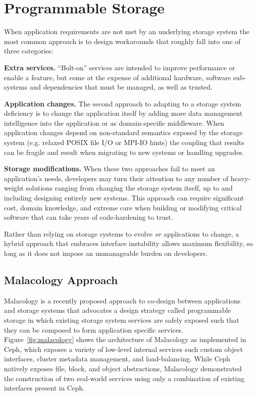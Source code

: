 \section{Programmable Storage}
\label{sec:progly}

When application requirements are not met by an underlying storage system the
most common approach is to design workarounds that roughly fall into one
of three categories:

{\bf Extra services.} ``Bolt-on'' services are intended to improve performance
or enable a feature, but come at the expense of additional hardware, software
sub-systems and dependencies that must be managed, as well as trusted.

{\bf Application changes.} The second approach to adapting to a storage system
deficiency is to change the application itself by adding more data management
intelligence into the application or as domain-specific middleware. When
application changes depend on non-standard semantics exposed by the storage
system (e.g. relaxed POSIX file I/O or MPI-IO hints) the coupling that results
can be fragile and result when migrating to new systems or handling upgrades.

{\bf Storage modifications.} When these two approaches fail to meet an
application's needs, developers may turn their attention to any number of
heavy-weight solutions ranging from changing the storage system itself, up to
and including designing entirely new systems. This approach can require
significant cost, domain knowledge, and extreme care when building or
modifying critical software that can take years of code-hardening to trust.

Rather than relying on storage systems to evolve \emph{or} applications to
change, a hybrid approach that embraces interface instability allows maximum
flexibility, so long as it does not impose an unmanageable burden on
developers.

\subsection{Malacology Approach}

Malacology is a recently proposed approach to co-design between applications
and storage systems that advocates a design strategy called programmable
storage in which existing storage system services are safely exposed such that
they can be composed to form application specific services.
Figure~\ref{fig:malacology} shows the architecture of Malacology as
implemented in Ceph, which exposes a variety of low-level internal services
such custom object interfaces, cluster metadata management, and
load-balancing. While Ceph natively exposes file, block, and object
abstractions, Malacology demonstrated the construction of two real-world
services using only a combination of existing interfaces present in Ceph.


